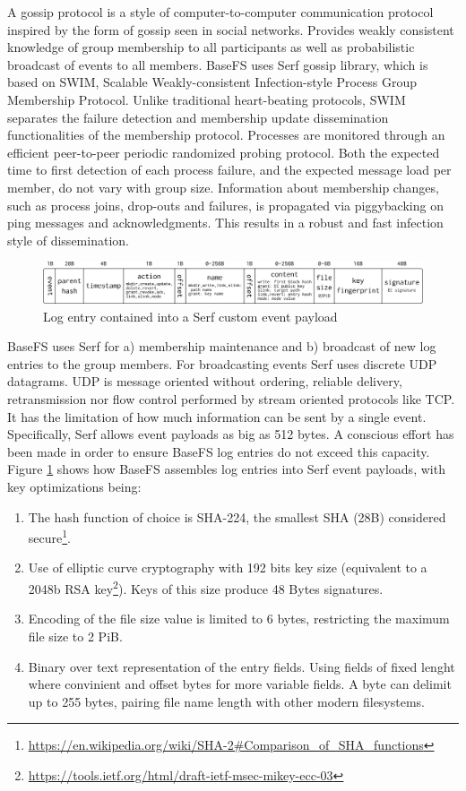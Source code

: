 \documentclass{sig-alternate}
\begin{document}
A gossip protocol is a style of computer-to-computer communication protocol inspired by the form of gossip seen in social networks. Provides weakly consistent knowledge of group membership to all participants as well as probabilistic broadcast of events to all members. BaseFS uses Serf gossip library, which is based on SWIM, Scalable Weakly-consistent Infection-style Process Group Membership Protocol\cite{SWIM}. Unlike traditional heart-beating protocols, SWIM separates the failure detection and membership update dissemination functionalities of the membership protocol. Processes are monitored through an efficient peer-to-peer periodic randomized probing protocol. Both the expected time to first detection of each process failure, and the expected message load per member, do not vary with group size. Information about membership changes, such as process joins, drop-outs and failures, is propagated via piggybacking on ping messages and acknowledgments. This results in a robust and fast infection style of dissemination. 


\begin{figure}
\centering
\includegraphics[width=\textwidth]{imgs/payload.png}
\caption{Log entry contained into a Serf custom event payload}
\label{fig:payload}
\end{figure}

BaseFS uses Serf for a) membership maintenance and b) broadcast of new log entries to the group members. For broadcasting events Serf uses discrete UDP datagrams. UDP is message oriented without ordering, reliable delivery, retransmission nor flow control performed by stream oriented protocols like TCP. It has the limitation of how much information can be sent by a single event. Specifically, Serf allows event payloads as big as 512 bytes. A conscious effort has been made in order to ensure BaseFS log entries do not exceed this capacity. Figure \ref{fig:payload} shows how BaseFS assembles log entries into Serf event payloads, with key optimizations being:

\begin{enumerate}
\item The hash function of choice is SHA-224, the smallest SHA (28B) considered secure\footnote{\url{https://en.wikipedia.org/wiki/SHA-2\#Comparison\_of\_SHA\_functions}}.
\item Use of elliptic curve cryptography with 192 bits key size (equivalent to a 2048b RSA key\footnote{\url{https://tools.ietf.org/html/draft-ietf-msec-mikey-ecc-03}}). Keys of this size produce 48 Bytes signatures.
\item Encoding of the file size value is limited to 6 bytes, restricting the maximum file size to 2 PiB.
\item Binary over text representation of the entry fields. Using fields of fixed lenght where convinient and offset bytes for more variable fields. A byte can delimit up to 255 bytes, pairing file name length with other modern filesystems.
\end{enumerate}
\end{document}
